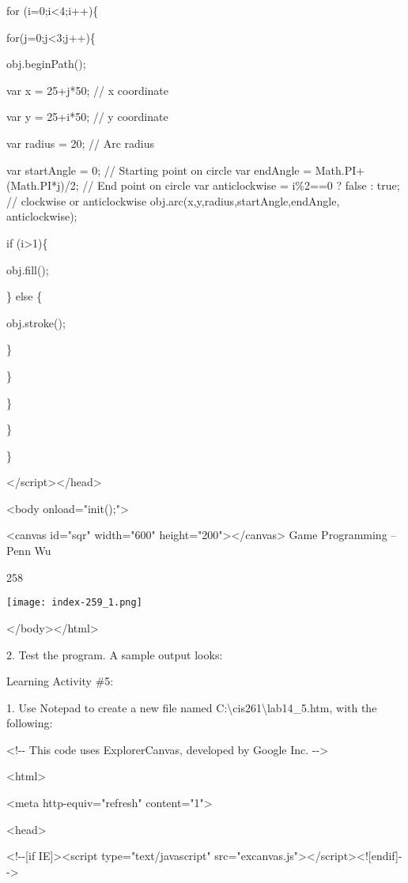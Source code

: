 \documentclass[
]{article}
\begin{document}
for (i=0;i\textless4;i++)\{

for(j=0;j\textless3;j++)\{

obj.beginPath();

var x = 25+j*50; // x coordinate

var y = 25+i*50; // y coordinate

var radius = 20; // Arc radius

var startAngle = 0; // Starting point on circle var endAngle =
Math.PI+(Math.PI*j)/2; // End point on circle var anticlockwise =
i\%2==0 ? false : true; // clockwise or anticlockwise
obj.arc(x,y,radius,startAngle,endAngle, anticlockwise);

if (i\textgreater1)\{

obj.fill();

\} else \{

obj.stroke();

\}

\}

\}

\}

\}

\textless/script\textgreater\textless/head\textgreater{}

\textless body onload="init();"\textgreater{}

\textless canvas id="sqr" width="600"
height="200"\textgreater\textless/canvas\textgreater{} Game Programming
-- Penn Wu

258

\protect\hypertarget{index_split_013.htmlux5cux23p259}{}{}\texttt{[image: index-259\_1.png]}

\textless/body\textgreater\textless/html\textgreater{}

2. Test the program. A sample output looks:

Learning Activity \#5:

1. Use Notepad to create a new file named
C:\textbackslash cis261\textbackslash lab14\_5.htm, with the following:

\textless!-\/- This code uses ExplorerCanvas, developed by Google Inc.
-\/-\textgreater{}

\textless html\textgreater{}

\textless meta http-equiv="refresh" content="1"\textgreater{}

\textless head\textgreater{}

\textless!-\/-{[}if IE{]}\textgreater\textless script
type="text/javascript"
src="excanvas.js"\textgreater\textless/script\textgreater\textless!{[}endif{]}-\/-\textgreater{}
\end{document}
